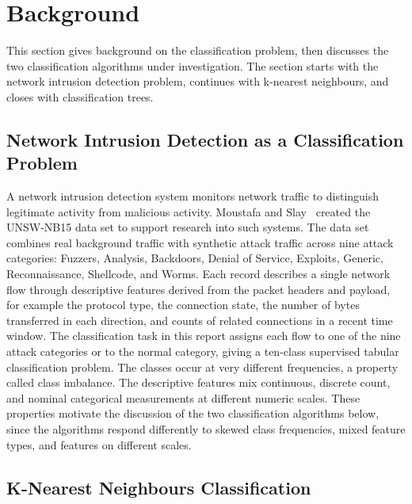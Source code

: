 \documentclass[10pt,conference]{IEEEtran}
\begin{document}
\section{Background}
\label{sec:background}

This section gives background on the classification problem, then discusses the two classification algorithms under investigation. The section starts with the network intrusion detection problem, continues with k-nearest neighbours, and closes with classification trees.

\subsection{Network Intrusion Detection as a Classification Problem}
\label{sec:background-nid}

A network intrusion detection system monitors network traffic to distinguish legitimate activity from malicious activity. Moustafa and Slay~\cite{moustafa2015} created the UNSW-NB15 data set to support research into such systems. The data set combines real background traffic with synthetic attack traffic across nine attack categories: Fuzzers, Analysis, Backdoors, Denial of Service, Exploits, Generic, Reconnaissance, Shellcode, and Worms. Each record describes a single network flow through descriptive features derived from the packet headers and payload, for example the protocol type, the connection state, the number of bytes transferred in each direction, and counts of related connections in a recent time window. The classification task in this report assigns each flow to one of the nine attack categories or to the normal category, giving a ten-class supervised tabular classification problem. The classes occur at very different frequencies, a property called class imbalance. The descriptive features mix continuous, discrete count, and nominal categorical measurements at different numeric scales. These properties motivate the discussion of the two classification algorithms below, since the algorithms respond differently to skewed class frequencies, mixed feature types, and features on different scales.

\subsection{K-Nearest Neighbours Classification}
\label{sec:background-knn}
\end{document}
